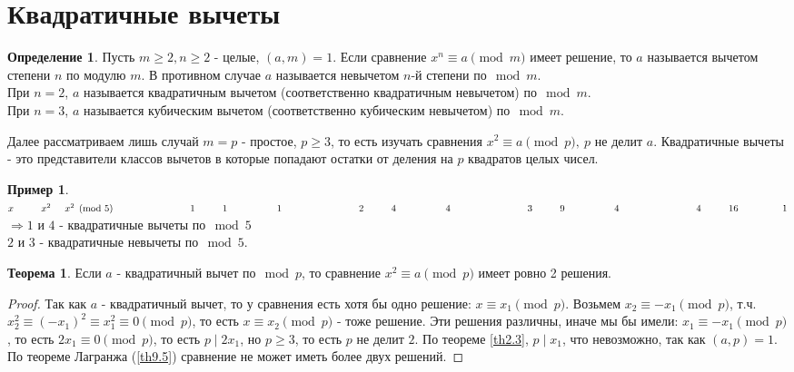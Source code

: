 \documentclass[a4paper, 12pt]{article}
\renewcommand{\div}{\mid}
\newcommand\tab[1][.5cm]{\hspace*{#1}}
\theoremstyle{definition}
\newtheorem{definition}{Определение}[section]
\newtheorem{theorem}{Теорема}[section]
\newtheorem*{example}{Пример}
\begin{document}
    \section{Квадратичные вычеты}
    \begin{definition}
        Пусть $m\geq 2, n\geq 2$ - целые, $(a,m)=1$. Если сравнение $x^n\equiv a\pmod{m}$ имеет решение, то $a$ называется вычетом степени $n$ по модулю $m$. В противном случае $a$ называется невычетом $n$-й степени по$\mod{m}$.\\
        При $n=2$, $a$ называется квадратичным вычетом (соответственно квадратичным невычетом) по$\mod{m}$.\\
        При $n=3$, $a$ называется кубическим вычетом (соответственно кубическим невычетом) по$\mod{m}$.
    \end{definition} 
        Далее рассматриваем лишь случай $m=p$ - простое, $p\geq 3$, то есть изучать сравнения $x^2\equiv a\pmod{p},\ p$ не делит $a$. Квадратичные вычеты - это представители классов вычетов в которые попадают остатки от деления на $p$ квадратов целых чисел.
    \begin{example}\tab
        $x\tab[1cm] x^2\tab x^2\pmod{5}\\
        \tab[2.8cm]1\tab[1cm] 1\tab[1.8cm] 1\\
        \tab[2.8cm]2\tab[1cm] 4\tab[1.8cm] 4\\
        \tab[2.8cm]3\tab[1cm] 9\tab[1.8cm] 4\\
        \tab[2.8cm]4\tab[1cm] 16\tab[1.6cm] 1\\$
        $\Rightarrow 1$ и $4$ - квадратичные вычеты по$\mod{5}$\\
        $2$ и $3$ - квадратичные невычеты по$\mod{5}$.
    \end{example}
    \begin{theorem}\label{th10.1}
        Если $a$ - квадратичный вычет по$\mod{p}$, то сравнение $x^2\equiv a\pmod{p}$ имеет ровно 2 решения.
    \end{theorem} 
    \begin{proof}
        Так как $a$ - квадратичный вычет, то у сравнения есть хотя бы одно решение: $x\equiv x_1\pmod{p}$. Возьмем $x_2\equiv -x_1\pmod{p}$, т.ч. $x_2^2\equiv (-x_1)^2\equiv x_1^2\equiv 0\pmod{p}$, то есть $x\equiv x_2\pmod{p}$ - тоже решение. Эти решения различны, иначе мы бы имели: $x_1\equiv -x_1\pmod{p}$, то есть $2x_1\equiv 0\pmod{p}$, то есть $p\div 2x_1$, но $p\geq 3$, то есть $p$ не делит $2$. По теореме \ref{th2.3}, $p\div x_1$, что невозможно, так как $(a,p)=1$. По теореме Лагранжа (\ref{th9.5}) сравнение не может иметь более двух решений. 
    \end{proof} 
\end{document}
